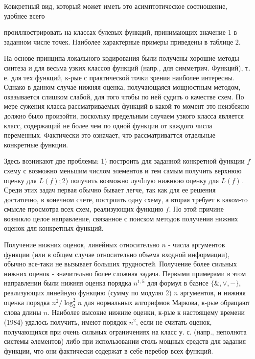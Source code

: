 \documentclass[10pt]{article}
\begin{document}
Ковкретный вид, который может иметь это асимптотическое соотношение, удобнее всего



проиллюстрировать на классах булевых функций, принимающих значение 1 в заданном числе точек. Наиболее характерные примеры приведены в таблице 2.



На основе принципа локального кодирования были получены хорошие методы синтеза и для весьма узких классов функций (напр., для симметрич. Функций), т. е. для тех функций, к-рые с практической точки зрения наиболее интересны. Однако в данном случае нижняя оценка, получающаяся мощностным методом, оказывается слишком слабой, для того чтобы по ней судить о качестве схем. По мере сужения класса рассматриваемых функций в какой-то момент это неизбежно должно было произойти, поскольку предельным случаем узкого класса является класс, содержащий не более чем по одной функции от каждого числа переменных. Фактически это означает, что рассматривагтся отдельные конкретные функции.



Здесь возникают две проблемы: 1) построить для заданной конкретной функции $f$ схему с возможно меньшим числом элементов и тем самым получить верхнюю оценку для $L(f) ; 2)$ получить возможно лучІпую нижнюю оценку для $L(f)$. Среди этих задач первая обычно бывает легче, так как для ее решения достаточно, в конечном счете, построить одну схему, а вторая требует в каком-то смысле просмотра всех схем, реализующих функцию $f$. По этой причине возникло целое направление, связанное с поиском методов получения нижних оценок для конкретных функций.



Получение нижних оценок, линейных относительно $n$ - числа аргументов функции (или в общем случае относительно объема входной информации), обычно все-таки не вызывает больших трудностей. Получение более сильных нижних оценок - значительно более сложная задача. Первыми примерами в этом направлении были нижняя оценка порядка $n^{1,5}$ для формул в базисе $\{\&, \vee,-\}$, реализующих линейную функцию (сумму по модулю 2) $n$ аргументов, и нижняя оценка порядка $n^{2} / \log _{2}^{2} n$ для нормальных алгорифмов Маркова, к-рые обращают слова длины $n$. Наиболее высокие нижние оценки, к-рые к настоящему времени (1984) удалось получить, имеют порядок $n^{2}$, если не считать оценок, получающихся при очень сильных ограничениях на класс у. с. (напр., неполнота системы әлементов) либо при использовании столь мощных средств для задания функции, что они фактически содержат в себе перебор всех функций.
\end{document}
